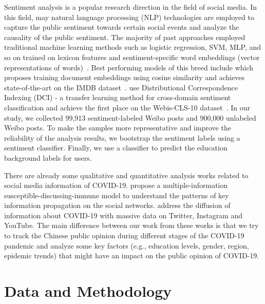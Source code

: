 \documentclass[sigconf, nonacm=true]{acmart}
\begin{document}
Sentiment analysis is a popular research direction in the field of social media. In this field, may natural language processing (NLP) technologies are employed to capture the public sentiment towards certain social events and analyze the causality of the public sentiment. The majority of past approaches employed traditional
machine learning methods such as logistic regression, SVM,
MLP, and so on trained on lexicon features and sentiment-specific
word embeddings (vector representations of words)~\cite{Maas2011LearningWV, Giahanou2016LikeIO}. Best performing models of this breed include \citet{Thongtan2019SentimentCU} which proposes training document embeddings using cosine similarity and achieves state-of-the-art on the IMDB dataset~\cite{Maas2011LearningWV}. \citet{Yin2015DynamicUM} use Distributional Correspondence Indexing (DCI) - a transfer learning method for cross-domain sentiment classification and achieve the first place on the Webis-CLS-10 dataset~\cite{Prettenhofer2011CrossLingualAU}. In our study, we collected 99,913 sentiment-labeled 
Weibo posts and 900,000 unlabeled Weibo posts. To make the samples more representative and improve the reliability of the analysis results, we bootstrap the sentiment labels using a sentiment classifier. Finally, we use a classifier to  predict the education background labels for users.

There are already some qualitative and quantitative analysis works related to social media information of COVID-19. \citet{yin2020covid} propose a multiple-information susceptible-discussing-immune model to understand the patterns of key information propagation on the  social networks.  \citet{Cinelli2020TheCS} address the diffusion of information about COVID-19 with massive data  on Twitter, Instagram and YouTube. The main difference between our work from these works is that we try to track the Chinese public opinion during different stages of the COVID-19 pandemic and analyze some key factors (e.g., 
education levels, gender, region, 
epidemic trends) that might have an impact on the public opinion of COVID-19. 


\section{Data and Methodology}
\end{document}
